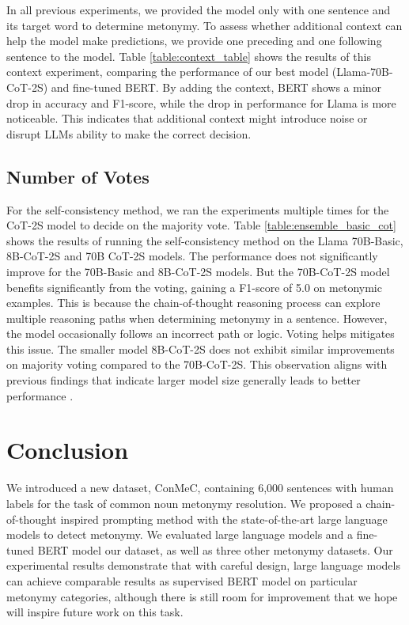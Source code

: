 \documentclass[11pt]{article}
\begin{document}
In all previous experiments, we provided the model only with one sentence and its target word to determine metonymy. To assess whether additional context can help the model make predictions, we provide one preceding and one following sentence to the model. Table \ref{table:context_table} shows the results of this context experiment, comparing the performance of our best model (Llama-70B-CoT-2S) and fine-tuned BERT. By adding the context, BERT shows a minor drop in accuracy and F1-score, while the drop in performance for Llama is more noticeable. This indicates that additional context might introduce noise or disrupt LLMs ability to make the correct decision.

\subsection{Number of Votes}

For the self-consistency method, we ran the experiments multiple times for the CoT-2S model to decide on the majority vote. Table \ref{table:ensemble_basic_cot} shows the results of running the self-consistency method on the Llama 70B-Basic, 8B-CoT-2S and 70B CoT-2S models. The performance does not significantly improve for the 70B-Basic and 8B-CoT-2S models. But the 70B-CoT-2S model benefits significantly from the voting, gaining a F1-score of 5.0 on metonymic examples. This is because the chain-of-thought reasoning process can explore multiple reasoning paths when determining metonymy in a sentence. However, the model occasionally follows an incorrect path or logic. Voting helps mitigates this issue. The smaller model 8B-CoT-2S does not exhibit similar improvements on majority voting compared to the 70B-CoT-2S. This observation aligns with previous findings that indicate larger model size generally leads to better performance \citep{scaling_law_paper, scaling_fine_tuned_paper}. 

\section{Conclusion}

We introduced a new dataset, ConMeC, containing 6,000 sentences with human labels for the task of common noun metonymy resolution. We proposed a chain-of-thought inspired prompting method with the state-of-the-art large language models to detect metonymy. We evaluated large language models and a fine-tuned BERT model our dataset, as well as three other metonymy datasets. Our experimental results demonstrate that with careful design, large language models can achieve comparable results as supervised BERT model on particular metonymy categories, although there is still room for improvement that we hope will inspire future work on this task.
\end{document}

